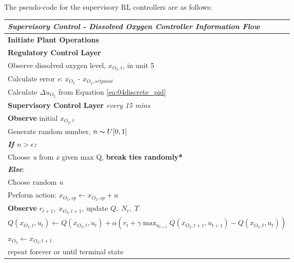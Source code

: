 The pseudo-code for the supervisory RL controllers are as follows:
\begin{table}[H]
	\begin{tabular}{p{15.5cm}}
	\hline
	\emph{Supervisory Control - Dissolved Oxygen Controller Information Flow} \\ \hline
	\textbf{Initiate Plant Operations} \\
	\hspace{0.75cm} \textbf{Regulatory Control Layer} \\
	\hspace{0.75cm} Observe dissolved oxygen level, $x_{O_2, t}$, in unit 5\\
	\hspace{0.75cm} Calculate error \emph{e}: $x_{O_2}$ - $x_{O_2, setpoint}$ \\
	\hspace{0.75cm} Calculate $\Delta u_{O_2}$ from Equation \ref{eq:04discrete_pid} \\
	\hspace{1.5cm} \textbf{Supervisory Control Layer} \emph{every 15 mins} \\
	\hspace{2.25cm} \textbf{Observe} initial $x_{O_2, t}$ \\
	\hspace{2.25cm} Generate random number, $n \thicksim U[0, 1]$ \\
    \hspace{2.25cm} \textbf{\emph{If $n > \epsilon$:}} \\ 
    \hspace{3cm} Choose \emph{u} from \emph{x} given max Q, \textbf{break ties randomly*} \\
    \hspace{2.25cm} \textbf{\emph{Else}}: \\
    \hspace{3cm} Choose random \emph{u} \\
	\hspace{2.25cm} Perform action: $x_{O_2, sp} \leftarrow x_{O_2, sp} + u$ \\
	\hspace{2.25cm} \textbf{Observe} $r_{t+1}, \; x_{O_2, t+1}$, update $Q, \; N_t, \; T$ \\
    \hspace{2.25cm} $Q(x_{O_2, t}, u_t) \leftarrow Q(x_{O_2, t}, u_t) + \alpha(r_t + \gamma \max_{u_{t+1}} Q(x_{O_2, t+1}, u_{t+1}) - Q(x_{O_2, t}, u_t))$ \\
	\hspace{2.25cm} $x_{O_2} \leftarrow x_{O_2, t+1}$ \\
	\hspace{0.75cm} repeat forever or until terminal state \\
	\hline
	\end{tabular}
\end{table}

